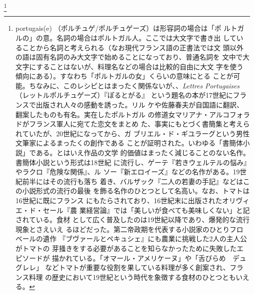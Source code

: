 \begin{recette}
\footnote{portugais(e)
  （ポルチュゲ/ポルチュゲーズ）は形容詞の場合は「ポ
  ルトガルの」の意。名詞の場合はポルトガル人。ここでは大文字で書き出
  していることから名詞と考えられる（なお現代フランス語の正書法では文
  頭以外の語は固有名詞のみ大文字で始めることになっており、普通名詞を
  文中で大文字にすることはないが、料理名などの場合は比較的自由に大文
  字を使う傾向にある）。すなわち「ポルトガルの女」くらいの意味にとる
  ことが可能。ちなみに、このレシピとはまったく関係ないが、、\emph{Lettres
  Portugaises} （レットルポルチュゲーズ）『ぽるとがる』
  という題名の本が17世紀にフランスで出版され人々の感動を誘った。リル
  ケや佐藤春夫が自国語に翻訳、翻案したものも有名。実在したポルトガル
  の修道女マリアナ・アルコフォラドがフランス軍人に宛てた恋文をまとめ
  た、事実にもとづく書簡集と考えられていたが、20世紀になってから、ガ
  ブリエル・ド・ギユラーグという男性文筆家によるまったくの創作である
  ことが証明された。いわゆる「書簡体小説」である。とはいえ作品の文学
  的価値はまったく減じることのない名作。書簡体小説という形式は18世紀
  に流行し、ゲーテ『若きウェルテルの悩み』やラクロ『危険な関係』、ル
  ソー『新エロイーズ』などの名作がある。19世紀前半にはその流行も落ち
  着き、バルザック『二人の若妻の手記』などはこの小説形式の流行の最後
  を飾る名作のひとつとして名高い。なお、トマトは16世紀に既にフランス
  にもたらされており、16世紀末に出版されたオリヴィエ・ド・セール『農
  業経営論』では「美しいが食べても美味しくない」と記されている。食材
  として広く普及したのは19世紀以降であり、爆発的な流行現象とさえいえ
  るほどだった。第二帝政期を代表する小説家のひとりフロベールの遺作
  『ブヴァールとペキュシェ』にも農業に挑戦した2人の主人公がトマトの
  芽掻きをする必要があることを知らなかったために失敗したエピソードが
  描かれている。「オマール・アメリケーヌ」や「舌びらめ　デュグレレ」
  などトマトが重要な役割を果している料理が多く創案され、フランス料理
  の歴史において19世紀という時代を象徴する食材のひとつともいえる。}



\end{recette}
